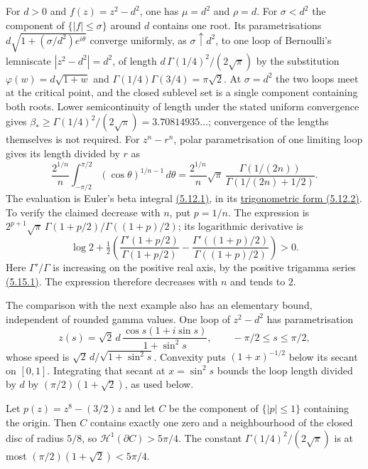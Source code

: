 \documentclass[11pt]{article}
\begin{document}
For $d>0$ and $f(z)=z^2-d^2$, one has $\mu=d^2$ and $\rho=d$.  For $\sigma<d^2$ the component
of $\{|f|\le\sigma\}$ around $d$ contains one root. Its parametrisations
$d\sqrt{1+(\sigma/d^2)e^{i\theta}}$ converge uniformly, as $\sigma\uparrow d^2$,
to one loop of Bernoulli's lemniscate $|z^2-d^2|=d^2$, of length $d\,\Gamma(1/4)^2/(2\sqrt\pi)$ by the substitution
$\varphi(w)=d\sqrt{1+w}$ and $\Gamma(1/4)\Gamma(3/4)=\pi\sqrt2$.  At
$\sigma=d^2$ the two loops meet at the critical point, and the closed sublevel
set is a single component containing both roots. Lower semicontinuity
of length under the stated uniform convergence gives
$\beta_*\ge\Gamma(1/4)^2/(2\sqrt\pi)=3.70814935\ldots$;
convergence of the lengths themselves is not required.
For $z^n-r^n$, polar parametrisation of one limiting loop gives its
length divided by $r$ as
\[
 \frac{2^{1/n}}{n}\int_{-\pi/2}^{\pi/2}
     (\cos\theta)^{1/n-1}\,d\theta
 =\frac{2^{1/n}}{n}\sqrt\pi\,
     \frac{\Gamma(1/(2n))}{\Gamma(1/(2n)+1/2)}.
\]
The evaluation is Euler's beta integral
\href{https://dlmf.nist.gov/5.12.E1}{(5.12.1)}, in its
\href{https://dlmf.nist.gov/5.12.E2}{trigonometric form (5.12.2)}.
To verify the claimed decrease with $n$, put $p=1/n$. The expression is
$2^{p+1}\sqrt\pi\,\Gamma(1+p/2)/\Gamma((1+p)/2)$; its logarithmic
derivative is
\[
 \log2+\tfrac12\left(
    \frac{\Gamma'(1+p/2)}{\Gamma(1+p/2)}-
    \frac{\Gamma'((1+p)/2)}{\Gamma((1+p)/2)}\right)>0.
\]
Here $\Gamma'/\Gamma$ is increasing on the positive real axis, by the
positive trigamma series \href{https://dlmf.nist.gov/5.15.E1}{(5.15.1)}.
The expression therefore decreases with $n$ and tends to $2$.

The comparison with the next example also has an elementary bound,
independent of rounded gamma values. One loop of $z^2-d^2$ has
parametrisation
\[
 z(s)=\sqrt2\,d\,
   \frac{\cos s(1+i\sin s)}{1+\sin^2s},
 \qquad -\pi/2\le s\le\pi/2,
\]
whose speed is $\sqrt2\,d/\sqrt{1+\sin^2s}$. Convexity puts
$(1+x)^{-1/2}$ below its secant on $[0,1]$. Integrating that secant
at $x=\sin^2s$ bounds the loop length divided by $d$ by
$(\pi/2)(1+\sqrt2)$, as used below.

\begin{proposition}
\label{res:one-root-gamma-false}
Let $p(z)=z^8-(3/2)z$ and let $C$ be the component of $\{|p|\le1\}$
containing the origin.  Then $C$ contains exactly one zero and a
neighbourhood of the closed disc of radius $5/8$, so
$\mathcal H^1(\partial C)>5\pi/4$.  The constant
$\Gamma(1/4)^2/(2\sqrt{\pi})$ is at most $(\pi/2)(1+\sqrt2)<5\pi/4$.
\end{proposition}
\end{document}
